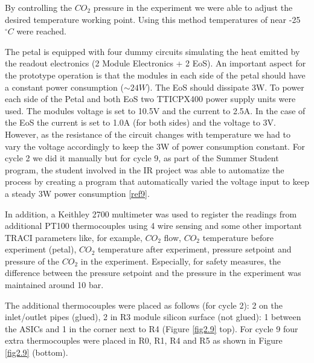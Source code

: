 		By controlling the $CO_{2}$ pressure in the experiment we were able to adjust the desired temperature working point. Using this method temperatures of near -25\space$^\circ C$ were reached.
		
		The petal is equipped with four dummy circuits simulating the heat emitted by the readout electronics (2 Module Electronics + 2 EoS). An important aspect for the prototype operation is that the modules in  each side of the petal should have a constant power consumption ($\sim 24W$). The EoS should dissipate 3W. To power each side of the Petal and both EoS two TTICPX400 power supply units were used. The modules voltage is set to 10.5V and the current to 2.5A. In the case of the EoS the current is set to 1.0A (for both sides) and the voltage to 3V. However, as the resistance of the circuit changes with temperature we had to vary the voltage accordingly to keep the 3W of power consumption constant. For cycle 2 we did it manually but for cycle 9, as part of the Summer Student program, the student involved in the IR project was able to automatize the process by creating a program that automatically varied the voltage input to keep a steady 3W power consumption \ref{ref9}.
		
		In addition, a Keithley 2700 multimeter was used to register the readings from additional PT100 thermocouples using 4 wire sensing and some other important TRACI parameters like, for example, $CO_{2}$ flow, $CO_{2}$ temperature before experiment (petal), $CO_{2}$ temperature after experiment, pressure setpoint and pressure of the $CO_{2}$ in the experiment. Especially, for safety measures, the difference between the pressure setpoint and the pressure in the experiment was maintained around 10 bar.
		
		The additional thermocouples were placed as follows (for cycle 2): 2 on the inlet/outlet pipes (glued), 2 in R3 module silicon surface (not glued): 1 between the ASICs and 1 in the corner next to R4 (Figure \ref{fig2.9} top). For cycle 9 four extra thermocouples were placed in R0, R1, R4 and R5 as shown in Figure \ref{fig2.9} (bottom).
		
